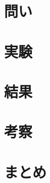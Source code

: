 \documentclass[titlepage]{jsarticle}
\begin{document}
\section{問い}










\section{実験}










\section{結果}










\section{考察}










\section{まとめ}
\end{document}
